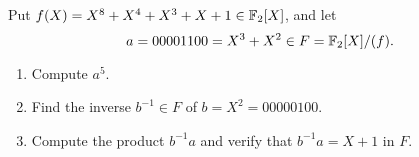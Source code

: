 \begin{problem}
Put $f(X)=X^8+X^4+X^3+X+1 \in \mathbb{F}_2[X]$, and let 
\[ a=00001100=X^3+X^2 \in F=\mathbb{F}_2[X]/(f). \]  
\begin{enumerate}\renewcommand{\itemsep}{3mm}
\item Compute $a^5$.  
\item Find the inverse $b^{-1} \in F$ of $b=X^2=00000100$.
\item Compute the product $b^{-1}a$ and verify that $b^{-1}a = X+1$ in $F$.
\end{enumerate}
\end{problem}
